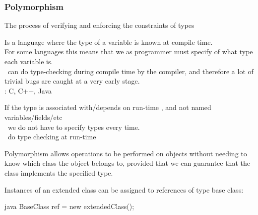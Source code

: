 \subsubsection{Polymorphism}
\begin{defnbox}\nospacing
  \begin{defn}
    The process of verifying and enforcing the constraints of types
  \end{defn}
\end{defnbox}
\begin{defnbox}\nospacing
  \begin{defn}
    Is a language where the type of a variable is known at compile time.\\
    For some languages this means that we as programmer must specify of what type each variable is.\\
    \Advantage\ can do type-checking during compile time by the compiler, and therefore a lot of trivial bugs are caught at a very early stage.\\
    : C, C++, Java
  \end{defn}
\end{defnbox}
\begin{defnbox}\nospacing
  \begin{defn}
     If the type is associated with/depends on run-time , and not named variables/fields/etc\\
     \Advantage\ we do not have to specify types every time.\\
     \Drawback\ do type checking at run-time
  \end{defn}
\end{defnbox}
\label{subsubsec:Polymorphism}
\begin{defnbox}\nospacing
  \begin{defn}[Polymorphism]\label{defn:polymorphism}
    Polymorphism allows operations to be performed on objects without needing to know which class the object belongs to,
    provided that we can guarantee that the class implements the specified type.
  \end{defn}
\end{defnbox}
\begin{defnbox}\nospacing
  \begin{defn}
    Instances of an extended class can be assigned to references of type base
    class:
    \begin{mintlinebox}{java}
      BaseClass ref = new extendedClass();
    \end{mintlinebox}
  \end{defn}
\end{defnbox}
